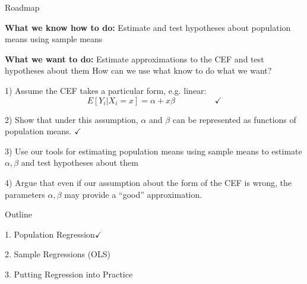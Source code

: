 \documentclass[11pt,english,handout]{beamer}
\newenvironment{wideitemize}{\itemize\addtolength{\itemsep}{10pt}}{\enditemize}
\begin{document}
\begin{frame}{Roadmap}
	\begin{wideitemize}
		\item \textbf{What we know how to do:} Estimate and test hypotheses about population means using sample means
		\item \textbf{What we want to do:} Estimate approximations to the CEF and test hypotheses about them 
	\end{wideitemize}
	\bigskip
	How can we use what know to do what we want? 

	\begin{wideitemize}
		\item 1) Assume the CEF takes a particular form, e.g. linear:
		$$E[Y_i | X_i = x] = \alpha + x \beta \hspace{2cm }\checkmark$$
		
		\item 2) Show that under this assumption, $\alpha$ and $\beta$ can be represented as functions of population means. $\checkmark$
		
		\item
		3) Use our tools for estimating population means using sample means to estimate $\alpha,\beta$ and test hypotheses about them
		
		\item
		4) Argue that even if our assumption about the form of the CEF is wrong, the parameters $\alpha,\beta$ may provide a ``good'' approximation.
	\end{wideitemize}
	
\end{frame}

\begin{frame}{Outline}

\textcolor{red!75!green!50!blue!25!gray}{1. Population Regression}$\checkmark$
\vspace{0.8cm}

2. Sample Regressions (OLS)
\vspace{0.8cm}

\textcolor{red!75!green!50!blue!25!gray}{3. Putting Regression into Practice}

\end{frame}
\end{document}
